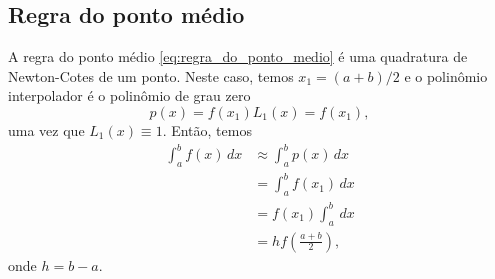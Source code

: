 
\subsection{Regra do ponto médio}

A regra do ponto médio \eqref{eq:regra_do_ponto_medio} é uma quadratura de Newton-Cotes de um ponto. Neste caso, temos $x_1 = (a+b)/2$ e o polinômio interpolador é o polinômio de grau zero
\begin{equation}
  p(x) = f(x_1)L_1(x) = f(x_1),
\end{equation}
uma vez que $L_1(x)\equiv 1$. Então, temos
\begin{equation}
  \begin{split}
    \int_a^b f(x)\,dx &\approx \int_a^b p(x)\,dx\\
    &= \int_a^b f(x_1)\,dx\\
    &= f(x_1)\int_a^b\,dx\\
    &= hf\left(\frac{a+b}{2}\right),
  \end{split}
\end{equation}
onde $h=b-a$.

